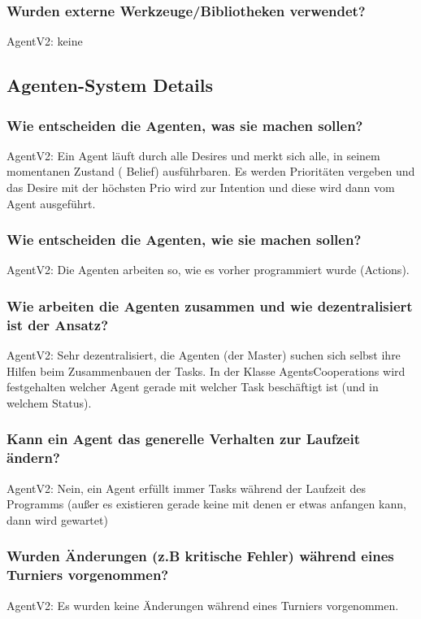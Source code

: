 \documentclass[runningheads]{llncs}
\begin{document}
\subsubsection{Wurden externe Werkzeuge/Bibliotheken verwendet?\\}
AgentV2: keine
\subsection{Agenten-System Details}
\subsubsection{Wie entscheiden die Agenten, was sie machen sollen?\\}
AgentV2: Ein Agent läuft durch alle Desires und merkt sich alle, in seinem momentanen Zustand ( Belief) ausführbaren. Es werden Prioritäten vergeben und das Desire mit der höchsten Prio wird zur Intention und diese wird dann vom Agent ausgeführt.
\subsubsection{Wie entscheiden die Agenten, wie sie machen sollen?\\}
AgentV2: Die Agenten arbeiten so, wie es vorher programmiert wurde (Actions). 
\subsubsection{Wie arbeiten die Agenten zusammen und wie dezentralisiert ist der Ansatz?\\}
AgentV2: Sehr dezentralisiert, die Agenten (der Master) suchen sich selbst ihre Hilfen beim Zusammenbauen der Tasks. In der Klasse AgentsCooperations wird festgehalten welcher Agent gerade mit welcher Task beschäftigt ist (und in welchem Status).
\subsubsection{Kann ein Agent das generelle Verhalten zur Laufzeit ändern?\\}
AgentV2: Nein, ein Agent erfüllt immer Tasks während der Laufzeit des Programms (außer es existieren gerade keine mit denen er etwas anfangen kann, dann wird gewartet)
\subsubsection{Wurden Änderungen (z.B kritische Fehler) während eines Turniers vorgenommen?\\}
AgentV2: Es wurden keine Änderungen während eines Turniers vorgenommen.
\end{document}

